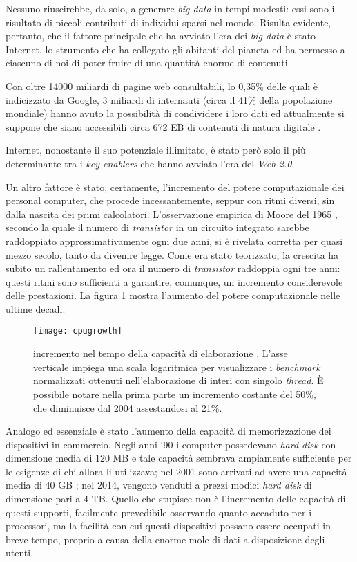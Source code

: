 Nessuno riuscirebbe, da solo, a generare \textit{big data} in tempi modesti: essi sono il risultato di piccoli contributi di individui sparsi nel mondo. Risulta evidente, pertanto, che il fattore 
principale che ha avviato l’era dei \textit{big data} è stato Internet, lo strumento che ha collegato gli abitanti del pianeta ed ha permesso a ciascuno di noi di poter fruire di una quantità 
enorme di contenuti.

Con oltre 14000 miliardi di pagine web consultabili, lo 0,35\% delle quali è indicizzato da Google, 3 miliardi di internauti (circa il 41\% della popolazione mondiale) 
hanno avuto la possibilità di condividere i loro dati ed attualmente si suppone che siano accessibili circa 672 EB di contenuti di natura digitale \cite{URL:factshunt}.

Internet, nonostante il suo potenziale illimitato, è stato però solo il più determinante tra i \textit{key-enablers} che hanno avviato l’era del \textit{Web 2.0}.

Un altro fattore è stato, certamente, l’incremento del potere computazionale dei personal computer, che procede incessantemente, seppur con ritmi diversi, sin dalla nascita dei 
primi calcolatori. L’osservazione empirica di Moore del 1965 \cite{moore}, secondo la quale il numero di \textit{transistor} in un 
circuito integrato sarebbe raddoppiato approssimativamente ogni due anni, si è rivelata corretta per quasi mezzo secolo, tanto da divenire legge. Come era stato teorizzato, la 
crescita ha subito un rallentamento ed ora il numero di \textit{transistor} raddoppia ogni tre anni: questi ritmi sono sufficienti a garantire, comunque, un incremento considerevole delle
prestazioni. La figura \ref{cpuinc} mostra l’aumento del potere computazionale nelle ultime decadi.

\begin{figure}[ht]
\centering
\texttt{[image: cpugrowth]}
\caption{incremento nel tempo della capacità di elaborazione \cite{URL:cpuimage}. L'asse verticale impiega una scala logaritmica per visualizzare i \textit{benchmark} normalizzati ottenuti 
nell'elaborazione di interi con singolo \textit{thread}. È possibile notare nella prima parte un incremento costante del 50\%, che diminuisce dal 2004 assestandosi al 21\%.}
\label{cpuinc}
\end{figure}

Analogo ed essenziale è stato l’aumento della capacità di memorizzazione dei dispositivi in commercio. Negli anni ‘90 i computer possedevano \textit{hard disk} con dimensione media di 120 MB 
e tale capacità sembrava ampiamente sufficiente per le esigenze di chi allora li utilizzava; nel 2001 sono arrivati ad avere una capacità media di 40 GB \cite{URL:storagegrowth}; 
nel 2014, vengono venduti a prezzi modici \textit{hard disk} di dimensione pari a 4 TB. Quello che stupisce non è l’incremento delle capacità di questi supporti, facilmente prevedibile 
osservando quanto accaduto per i processori, ma la facilità con cui questi dispositivi possano essere occupati in breve tempo, proprio a causa della enorme mole di dati a disposizione 
degli utenti.


